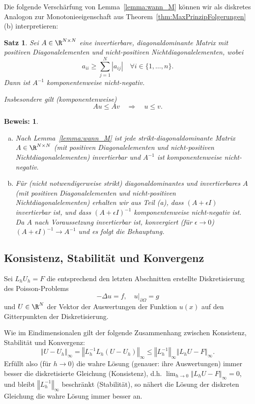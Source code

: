 \documentclass[
]{mycourse}
\theoremstyle{mythm}
\newtheorem{theorem}{Satz}[chapter]
\theoremstyle{break}
\newtheorem*{beweis}{Beweis:}
\newcommand{\norm}[1]{\left\Vert#1\right\Vert}		%
\begin{document}
Die folgende Verschärfung von Lemma~\ref{lemma:wann_M}
können wir als diskretes Analogon zur 
Monotonieeigenschaft aus Theorem~\ref{thm:MaxPrinzipFolgerungen}(b) interpretieren:
\begin{theorem}
Sei $A\in \R^{N\times N}$ eine invertierbare, diagonaldominante Matrix mit positiven Diagonalelementen und nicht-positiven Nichtdiagonalelementen,
wobei
\[
a_{ii}\geq \sum_{j=1}^N |a_{ij}| \quad \forall i\in \{1,\ldots,n\}. 
\]
Dann ist $A^{-1}$ komponentenweise nicht-negativ.

Insbesondere gilt (komponentenweise)
\[
A u\leq A v \quad \Longrightarrow \quad u\leq v.
\]
\end{theorem}
\begin{beweis}
\begin{enumerate}[(a)]
\item Nach Lemma~\ref{lemma:wann_M} ist jede strikt-diagonaldominante Matrix $A\in \R^{N\times N}$
(mit positiven Diagonalelementen und nicht-positiven Nichtdiagonalelementen) invertierbar 
und $A^{-1}$ ist komponentenweise nicht-negativ.
%
\item Für (nicht notwendigerweise strikt) diagonaldominantes und invertierbares $A$ (mit positiven Diagonalelementen und nicht-positiven Nichtdiagonalelementen) erhalten wir aus Teil (a),
dass $(A+\epsilon I)$ invertierbar ist, und dass $(A+\epsilon I)^{-1}$ komponentenweise nicht-negativ ist. Da $A$ nach Voraussetzung invertierbar ist, konvergiert (für $\epsilon\to 0$) $(A+\epsilon I)^{-1}\to A^{-1}$ und es folgt die Behauptung.
\end{enumerate}
\end{beweis}

\subsection{Konsistenz, Stabilität und Konvergenz}

Sei $L_h U_h=F$ die entsprechend den letzten Abschnitten erstellte Diskretisierung des Poisson-Problems
\[
-\Delta u=f, \quad u|_{\partial \Omega}=g
\]
und $U\in \R^N$ der Vektor der Auswertungen der Funktion $u(x)$ auf den Gitterpunkten der Diskretisierung.

Wie im Eindimensionalen gilt der folgende Zusammenhang zwischen Konsistenz, Stabilität und Konvergenz:
\[
\norm{U-U_h}_\infty = \norm{L_h^{-1} L_h (U-U_h)}_\infty\leq \norm{L_h^{-1}}_\infty \norm{L_h U - F}_\infty.
\]
Erfüllt also (für $h\to 0$) die wahre Lösung (genauer: ihre Auswertungen) immer besser die diskretisierte Gleichung (Konsistenz),
d.h. $\lim_{h\to 0} \norm{L_h U - F}_\infty=0$, und bleibt $\norm{L_h^{-1}}_\infty$ beschränkt (Stabilität), so nähert die
Lösung der diskreten Gleichung die wahre Lösung immer besser an.
\end{document}
